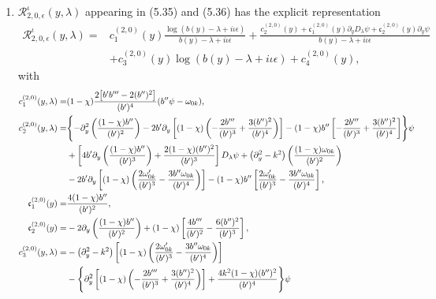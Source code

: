 \documentclass[reqno,11pt]{amsart}
\numberwithin{equation}{section}
\numberwithin{equation}{section} %
\begin{document}
\begin{enumerate}
    \item $\mathcal{R}^\iota_{2,0,\epsilon}(y,\lambda)$ appearing in (5.35) and (5.36) has the explicit representation
    \begin{equation}\label{ndR20}
        \begin{split}
            \mathcal{R}^\iota_{2,0,\epsilon}(y,\lambda)=&c_1^{(2,0)}(y)\frac{\log(b(y)-\lambda+i\iota\epsilon)}{b(y)-\lambda+i\iota\epsilon}+\frac{c_2^{(2,0)}(y)+\mathfrak{c}_1^{(2,0)}(y)\partial_yD_\lambda\psi+\mathfrak{c}_2^{(2,0)}(y)\partial_y\psi}{b(y)-\lambda+i\iota\epsilon}\\
            &+c_3^{(2,0)}(y)\log(b(y)-\lambda+i\iota\epsilon)+c_4^{(2,0)}(y),
        \end{split}
    \end{equation}
    with
    \begin{align}
      c_1^{(2,0)}(y,\lambda)=&(1-\chi)\frac{2\bigl[b'b'''-2(b'')^2\bigr]}{(b')^4}(b''\psi-\omega_{0k}),\notag\\
      c_2^{(2,0)}(y,\lambda)=
      &\Biggl\{-\partial_y^2\left(\frac{(1-\chi)b''}{(b')^2}\right)-2b'\partial_y\left[(1-\chi)\left(-\frac{2b'''}{(b')^3}+\frac{3(b'')^2}{(b')^4}\right)\right]-(1-\chi)b''\left[-\frac{2b'''}{(b')^3}+\frac{3(b'')^2}{(b')^4}\right]\Biggr\}\psi\notag\\
      &+\left[4b'\partial_y\left(\frac{(1-\chi)b''}{(b')^3}\right)+\frac{2(1-\chi)(b'')^2}{(b')^3}\right]D_\lambda\psi+\bigl(\partial_y^2-k^2\bigr)\left(\frac{(1-\chi)\omega_{0k}}{(b')^2}\right)\notag\\
      &-2b'\partial_y\left[(1-\chi)\left(\frac{2\omega_{0k}'}{(b')^3}-\frac{3b''\omega_{0k}}{(b')^4}\right)\right]-(1-\chi)b''\left[\frac{2\omega_{0k}'}{(b')^3}-\frac{3b''\omega_{0k}}{(b')^4}\right],\notag\\
      \mathfrak{c}_1^{(2,0)}(y)=&\frac{4(1-\chi)b''}{(b')^2},\notag\\
      \mathfrak{c}_2^{(2,0)}(y)=&-2\partial_y\left(\frac{(1-\chi)b''}{(b')^2}\right)+(1-\chi)\left[\frac{4b'''}{(b')^2}-\frac{6(b'')^2}{(b')^3}\right],\notag\\
      c_3^{(2,0)}(y,\lambda)=
      &-\bigl(\partial_y^2-k^2\bigr)\left[(1-\chi)
       \left(\frac{2\omega_{0k}'}{(b')^3}
                   -\frac{3b''\omega_{0k}}{(b')^4}\right)\right]\notag\\
      &-\Biggl\{\partial_y^2\left[(1-\chi)
       \left(-\frac{2b'''}{(b')^3}+\frac{3(b'')^2}{(b')^4}\right)\right]
       +\frac{4k^2(1-\chi)(b'')^2}{(b')^4}\Biggr\}\psi\notag\\

\end{align}
\end{enumerate}
\end{document}
